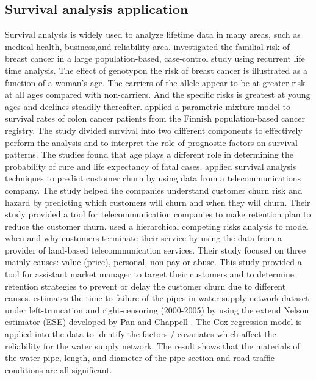 \documentclass[12pt,letterpaper]{article}
\begin{document}
\subsection{Survival analysis application}
Survival analysis is widely used to analyze lifetime data in many areas, such as medical health, business,and reliability area.
\citet{claus1991} investigated the familial risk of breast cancer in a large population-based, case-control study using recurrent life time analysis. The effect of genotypon the risk of breast cancer is illustrated as a function of a woman's age. The carriers of the allele appear to be at greater risk at all ages compared with non-carriers. And the specific risks is greatest at young ages and declines steadily thereafter. 
\citet{de1999} applied a parametric mixture model to survival rates of colon cancer patients from the Finnish population-based  cancer registry. The study divided survival into two different components to effectively perform the analysis and to interpret the role of prognostic factors on survival patterns. The studies found that age plays a different role in determining the probability of cure and life expectancy of fatal cases. 
\citet{lu2002} applied survival analysis techniques to predict customer churn by using data from a telecommunications company. The study helped the companies understand customer churn risk and hazard by predicting which customers will churn and when they will churn. Their study provided a tool for telecommunication companies to make retention plan to reduce the customer churn.
\citet{braun2011} used a hierarchical competing risks analysis to model when and why customers terminate their service by using the data from a provider of land-based telecommunication services. Their study focused on three mainly causes: value (price), personal, non-pay or abuse. %
This study provided a tool for assistant market manager to target their customers and to determine retention strategies to prevent or delay the customer churn due to different causes.
\citet{carrion2010} estimates the time to failure of the pipes in water supply network dataset under left-truncation and right-censoring (2000-2005) by using the extend Nelson estimator (ESE) developed by Pan and Chappell \citeyearpar{pan1998}. The Cox regression model is applied into the data to identify the factors / covariates which affect the reliability for the water supply network. The result shows that the materials of the water pipe, length, and diameter of the pipe section and road traffic conditions are all significant. %
\end{document}
